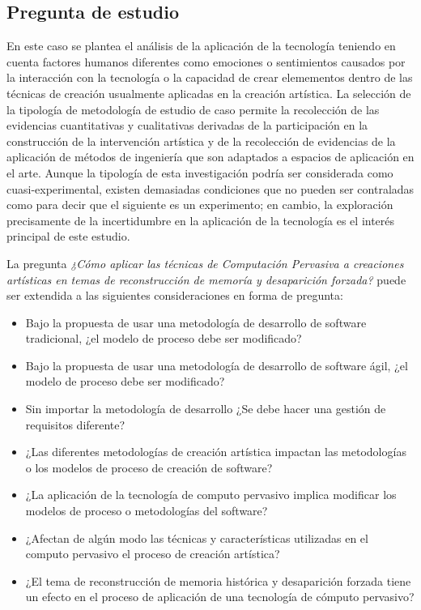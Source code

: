 \subsection{Pregunta de estudio}

En este caso se plantea el análisis de la aplicación de la tecnología teniendo en cuenta factores humanos diferentes como emociones o sentimientos causados por la interacción con la tecnología o la capacidad de crear elemementos dentro de las técnicas de creación usualmente aplicadas en la creación artística. La selección de la tipología de metodología de estudio de caso permite la recolección de las evidencias cuantitativas y cualitativas derivadas de la participación en la construcción de la intervención artística y de la recolección de evidencias de la aplicación de métodos de ingeniería que son adaptados a espacios de aplicación en el arte. Aunque la tipología de esta investigación podría ser considerada como cuasi-experimental, existen demasiadas condiciones que no pueden ser contraladas como para decir que el siguiente es un experimento; en cambio, la exploración precisamente de la incertidumbre en la aplicación de la tecnología es el interés principal de este estudio.

La pregunta \textit{¿Cómo aplicar las técnicas de Computación Pervasiva a creaciones artísticas en temas de reconstrucción de memoría y desaparición forzada?} puede ser extendida a las siguientes consideraciones en forma de pregunta:

\begin{itemize}
    \item Bajo la propuesta de usar una metodología de desarrollo de software tradicional, ¿el modelo de proceso debe ser modificado?
    \item Bajo la propuesta de usar una metodología de desarrollo de software ágil, ¿el modelo de proceso debe ser modificado?
    \item Sin importar la metodología de desarrollo ¿Se debe hacer una gestión de requisitos diferente?
    \item ¿Las diferentes metodologías de creación artística impactan las metodologías o los modelos de proceso de creación de software?
    \item ¿La aplicación de la tecnología de computo pervasivo implica modificar los modelos de proceso o metodologías del software?
    \item ¿Afectan de algún modo las técnicas y características utilizadas en el computo pervasivo el proceso de creación artística?
    \item ¿El tema de reconstrucción de memoria histórica y desaparición forzada tiene un efecto en el proceso de aplicación de una tecnología de cómputo pervasivo?
\end{itemize}

